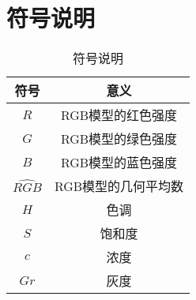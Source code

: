 \section{符号说明}

\begin{table}[H]
    \centering
    \caption{符号说明}
    \begin{tabular}{@{}cc@{}}
    \toprule
    符号       & 意义         \\ \midrule
    $R$      & RGB模型的红色强度        \\
    $G$      & RGB模型的绿色强度       \\
    $B$      & RGB模型的蓝色强度  \\
    $\hat{RGB}$ & RGB模型的几何平均数  \\
    $H$      & 色调       \\
    $S$      & 饱和度  \\
    $c$   & 浓度   \\
    $Gr$   & 灰度      \\ \bottomrule 
    \end{tabular}
\end{table}